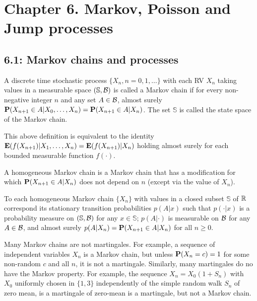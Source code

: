 \section*{Chapter 6. Markov, Poisson and Jump processes}
\subsection*{6.1: Markov chains and processes}
\begin{definition*} 
A discrete time stochastic process $\{X_n, n = 0, 1, \dots\}$ with each RV
$X_n$ taking values in a measurable space $(\mathbb{S},\mathcal{B})$ is called a Markov
chain if for every non-negative integer $n$ and any set $A \in \mathcal{B}$, almost
surely $\mathbf{P}(X_{n+1} \in A | X_0, \dots, X_n) = \mathbf{P}(X_{n+1} \in A | X_n)$. The
set $\mathbb{S}$ is called the state space of the Markov chain.
\end{definition*} 

\begin{remark*} 
This above definition is equivalent to the identity $\mathbf{E}(f(X_{n+1}) | X_1, \dots,
X_n) = \mathbf{E}(f(X_{n+1}) | X_n)$ holding almost surely for each bounded measurable
function $f(\cdot)$.
\end{remark*} 

\begin{definition*} 
A homogeneous Markov chain is a Markov chain that has a modification for which
$\mathbf{P}(X_{n+1} \in A | X_n)$ does not depend on $n$ (except via the value of
$X_n$).
\end{definition*} 

\begin{definition*} 
To each homogeneous Markov chain $\{X_n\}$ with values in a closed subset
$\mathbb{S}$ of $\mathbb{R}$ correspond its stationary transition probabilities $p(A|x)$
such that $p(\cdot | x)$ is a probability measure on $(\mathbb{S}, \mathcal{B})$ for any
$x \in \mathbb{S}$; $p(A|\cdot)$ is measurable on $\mathcal{B}$ for any $A \in \mathcal{B}$, and
almost surely $p(A | X_n) = \mathbf{P}(X_{n+1} \in A | X_n)$ for all $n \ge 0$.
\end{definition*} 

\begin{remark*} 
Many Markov chains are not martingales. For example, a sequence of independent
variables $X_n$ is a Markov chain, but unless $\mathbf{P}(X_n = c) = 1$ for some
non-random $c$ and all $n$, it is not a martingale. Similarly, many martingales
do no have the Markov property. For example, the sequence $X_n = X_0(1 + S_n)$
with $X_0$ uniformly chosen in $\{1, 3\}$ independently of the simple random
walk $S_n$ of zero mean, is a martingale of zero-mean is a martingale, but not a
Markov chain.
\end{remark*} 


